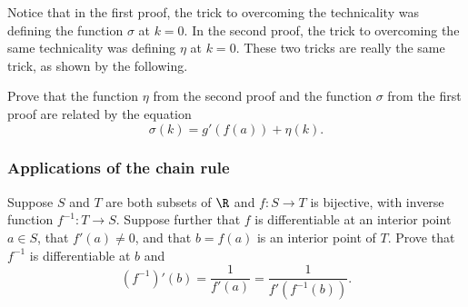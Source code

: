 Notice that in the first proof, the trick to overcoming the technicality was defining the function $\sigma$ at $k = 0$. In the second proof, the trick to overcoming the same technicality was defining $\eta$ at $k = 0$. These two tricks are really the same trick, as shown by the following.  

\begin{exercise}
	Prove that the function $\eta$ from the second proof and the function $\sigma$ from the first proof are related by the equation
	\[ \sigma(k) = g'(f(a)) + \eta(k). \]
\end{exercise}

\subsubsection{Applications of the chain rule}

\begin{exercise} \label{inverse-derivative}
	Suppose $S$ and $T$ are both subsets of $\R$ and $f : S \to T$ is bijective, with inverse function $f^{-1} : T \to S$. Suppose further that $f$ is differentiable at an interior point $a \in S$, that $f'(a) \neq 0$, and that $b = f(a)$ is an interior point of $T$. Prove that $f^{-1}$ is differentiable at $b$ and
	\[ (f^{-1})'(b) = \frac{1}{f'(a)} = \frac{1}{f'(f^{-1}(b))}. \]
\end{exercise}

